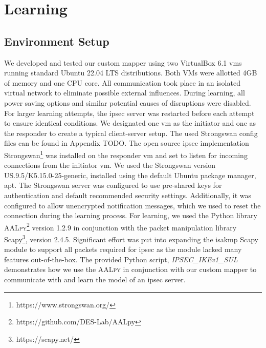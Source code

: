 %
%
% 
% 
% 

\chapter{Learning}

\label{chap:Learning}

\section{Environment Setup} \label{sec:learnenv}
We developed and tested our custom mapper using two VirtualBox 6.1 \ac{vm}s running standard Ubuntu 22.04 LTS distributions. Both VMs were allotted 4GB of memory and one CPU core. All communication took place in an isolated virtual network to eliminate possible external influences. During learning, all power saving options and similar potential causes of disruptions were disabled. For larger learning attempts, the \ac{ipsec} server was restarted before each attempt to ensure identical conditions. We designated one \ac{vm} as the initiator and one as the responder to create a typical client-server setup. The used Strongswan config files can be found in Appendix TODO. The open source \ac{ipsec} implementation Strongswan\footnote{https://www.strongswan.org/} was installed on the responder \ac{vm} and set to listen for incoming connections from the initiator \ac{vm}. We used the Strongswan version US.9.5/K5.15.0-25-generic, installed using the default Ubuntu package manager, apt. The Strongswan server was configured to use pre-shared keys for authentication and default recommended security settings. Additionally, it was configured to allow unencrypted notification messages, which we used to reset the connection during the learning process. For learning, we used the Python library \textsc{AALpy}\footnote{https://github.com/DES-Lab/AALpy} version 1.2.9 in conjunction with the packet manipulation library Scapy\footnote{https://scapy.net/}, version 2.4.5. Significant effort was put into expanding the \ac{isakmp} Scapy module to support all packets required for \ac{ipsec} as the module lacked many features out-of-the-box. The provided Python script, \emph{IPSEC\_IKEv1\_SUL} demonstrates how we use the \textsc{AALpy} in conjunction with our custom mapper to communicate with and learn the model of an \ac{ipsec} server.

